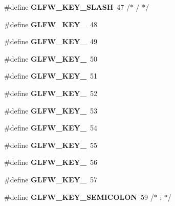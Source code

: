 \begin{DoxyCompactItemize}
\#define {\bfseries G\+L\+F\+W\+\_\+\+K\+E\+Y\+\_\+\+S\+L\+A\+SH}~47  /$\ast$ / $\ast$/
\item 
\mbox{\label{group__keys_ga50391730e9d7112ad4fd42d0bd1597c1}} 
\#define {\bfseries G\+L\+F\+W\+\_\+\+K\+E\+Y\+\_}~48
\item 
\mbox{\label{group__keys_ga05e4cae9ddb8d40cf6d82c8f11f2502f}} 
\#define {\bfseries G\+L\+F\+W\+\_\+\+K\+E\+Y\+\_}~49
\item 
\mbox{\label{group__keys_gadc8e66b3a4c4b5c39ad1305cf852863c}} 
\#define {\bfseries G\+L\+F\+W\+\_\+\+K\+E\+Y\+\_}~50
\item 
\mbox{\label{group__keys_ga812f0273fe1a981e1fa002ae73e92271}} 
\#define {\bfseries G\+L\+F\+W\+\_\+\+K\+E\+Y\+\_}~51
\item 
\mbox{\label{group__keys_ga9e14b6975a9cc8f66cdd5cb3d3861356}} 
\#define {\bfseries G\+L\+F\+W\+\_\+\+K\+E\+Y\+\_}~52
\item 
\mbox{\label{group__keys_ga4d74ddaa5d4c609993b4d4a15736c924}} 
\#define {\bfseries G\+L\+F\+W\+\_\+\+K\+E\+Y\+\_}~53
\item 
\mbox{\label{group__keys_ga9ea4ab80c313a227b14d0a7c6f810b5d}} 
\#define {\bfseries G\+L\+F\+W\+\_\+\+K\+E\+Y\+\_}~54
\item 
\mbox{\label{group__keys_gab79b1cfae7bd630cfc4604c1f263c666}} 
\#define {\bfseries G\+L\+F\+W\+\_\+\+K\+E\+Y\+\_}~55
\item 
\mbox{\label{group__keys_gadeaa109a0f9f5afc94fe4a108e686f6f}} 
\#define {\bfseries G\+L\+F\+W\+\_\+\+K\+E\+Y\+\_}~56
\item 
\mbox{\label{group__keys_ga2924cb5349ebbf97c8987f3521c44f39}} 
\#define {\bfseries G\+L\+F\+W\+\_\+\+K\+E\+Y\+\_}~57
\item 
\mbox{\label{group__keys_ga84233de9ee5bb3e8788a5aa07d80af7d}} 
\#define {\bfseries G\+L\+F\+W\+\_\+\+K\+E\+Y\+\_\+\+S\+E\+M\+I\+C\+O\+L\+ON}~59  /$\ast$ ; $\ast$/

\end{DoxyCompactItemize}

